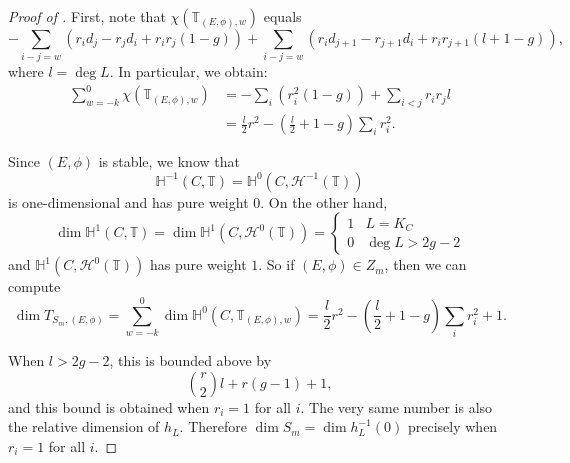 \documentclass[10pt,a4paper]{amsart}
\begin{document}
\begin{proof}[Proof of ]\label{pf:twistedstrata}
    First, note that $\chi(\mathbb{T}_{(E,\phi),w})$ equals
    \[-\sum_{i-j=w}(r_id_j - r_jd_i + r_ir_j(1-g)) + \sum_{i-j=w}(r_id_{j+1} - r_{j+1}d_i + r_ir_{j+1}(l + 1-g)),\]
    where $l=\deg L$.
    In particular, we obtain:
    \begin{align*}
        \sum_{w=-k}^0 \chi(\mathbb{T}_{(E,\phi),w}) &= -\sum_{i}(r_i^2(1-g)) + \sum_{i<j} r_ir_jl\\
        &= \frac{l}2r^2 - \left(\frac{l}2+1-g\right)\sum_ir_i^2.
    \end{align*}

    Since $(E,\phi)$ is stable, we know that
    \[\mathbb{H}^{-1}(C, \mathbb{T}) = \mathbb{H}^0(C, \mathcal H^{-1}(\mathbb{T})) \]
    is one-dimensional and has pure weight $0$.
    On the other hand,
    \[\dim\mathbb H^1(C, \mathbb{T}) = \dim\mathbb H^1(C, \mathcal H^0(\mathbb{T})) =\begin{cases} 1 & L = K_C\\ 0 & \deg L> 2g-2\end{cases}\]
    and $\mathbb H^1(C, \mathcal H^0(\mathbb{T}))$ has pure weight $1$.
    So if $(E,\phi)\in Z_m$, then we can compute
    \[\dim T_{S_m, (E,\phi)} = \sum_{w=-k}^0\dim \mathbb{H}^0(C, \mathbb{T}_{(E,\phi),w}) = \frac{l}2r^2 - \left(\frac{l}2+1-g\right)\sum_ir_i^2 + 1.\]

    When $l >2g-2$, this is bounded above by
    \[\binom{r}{2}l + r(g-1) + 1,\]
    and this bound is obtained when $r_i=1$ for all $i$.
    The very same number is also the relative dimension of $h_L$.
    Therefore $\dim S_m=\dim h_L^{-1}(0)$ precisely when $r_i=1$ for all $i$.
\end{proof}
\end{document}
